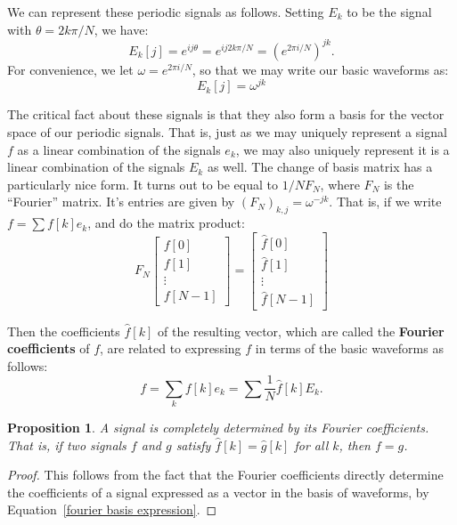 \documentclass[12pt]{report}
\theoremstyle{plain}
\newtheorem{prop}[thm]{Proposition}
\begin{document}
We can represent these periodic signals as follows. Setting $E_k$ to be the signal with $\theta= 2k\pi/N$, we have:
\[E_k[j] = e^{ij\theta} = e^{ij2k\pi/N} = \left(e^{2\pi i / N}\right)^{jk}. \]
For convenience, we let $\omega = e^{2 \pi i / N}$, so that we may write our basic waveforms as:
\[E_k[j] = \omega^{jk} \]

The critical fact about these signals is that they also form a basis for the vector space of our periodic signals. That is, just as we may uniquely represent a signal $f$ as a linear combination of the signals $e_k$, we may also uniquely represent it is a linear combination of the signals $E_k$ as well. The change of basis matrix has a particularly nice form. It turns out to be equal to $1/N F_N$, where $F_N$ is the ``Fourier'' matrix. It's entries are given by $(F_N)_{k,j} = \omega^{-jk}$. That is, if we write $f = \sum f[k] e_k$, and do the matrix product:
\[
F_N
\left[
\begin{matrix}
	f[0] \\
	f[1] \\
	\vdots \\
	f[N-1]
\end{matrix}
\right]
=
\left[
\begin{matrix}
	\hat f[0] \\
	\hat f[1] \\
	\vdots \\
	\hat f[N-1]
\end{matrix}
\right]
\]

Then the coefficients $\hat f[k]$ of the resulting vector, which are called the \textbf{Fourier coefficients} of $f$, are related to expressing $f$ in terms of the basic waveforms as follows:
\begin{equation} \label{fourier basis expression}
f = \sum_k f[k] e_k = \sum \frac 1 N \hat f[k] E_k.
\end{equation}

\begin{prop} \label{fourier coeffs determine}
A signal is completely determined by its Fourier coefficients. That is, if two signals $f$ and $g$ satisfy $\hat f[k] = \hat g[k]$ for all $k$, then $f = g$.
\end{prop}
\begin{proof}
This follows from the fact that the Fourier coefficients directly determine the coefficients of a signal expressed as a vector in the basis of waveforms, by Equation~\ref{fourier basis expression}.
\end{proof}
\end{document}
